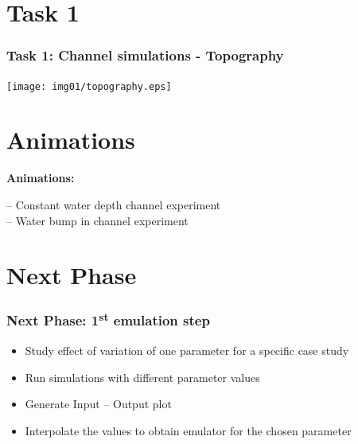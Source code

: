 \documentclass[xcolor=dvipsnames, USenglish]{beamer}  %
\begin{document}

\section{Task 1}

  \begin{frame}
    \frametitle{Task 1: Channel simulations - Topography}
    \centering
    \texttt{[image: img01/topography.eps]}
  \end{frame}


\section{Animations}
  {
  \begin{frame}[plain]
    \centering
    \Large{\textbf{Animations:}}\\
    \begin{flushleft}
      \Large{-- Constant water depth channel experiment}\\
      \Large{-- Water bump in channel experiment}
    \end{flushleft}
  \end{frame}
  }


\section{Next Phase}

  \begin{frame}
    \frametitle{Next Phase: 1\textsuperscript{st} emulation step}
    \begin{itemize}
      \item Study effect of variation of one parameter for a specific case study
      \item Run simulations with different parameter values
      \item Generate Input -- Output plot
      \item Interpolate the values to obtain emulator for the chosen parameter
    \end{itemize}
  \end{frame}
\end{document}
